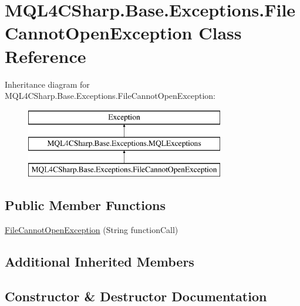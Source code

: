 \hypertarget{class_m_q_l4_c_sharp_1_1_base_1_1_exceptions_1_1_file_cannot_open_exception}{}\section{M\+Q\+L4\+C\+Sharp.\+Base.\+Exceptions.\+File\+Cannot\+Open\+Exception Class Reference}
\label{class_m_q_l4_c_sharp_1_1_base_1_1_exceptions_1_1_file_cannot_open_exception}
Inheritance diagram for M\+Q\+L4\+C\+Sharp.\+Base.\+Exceptions.\+File\+Cannot\+Open\+Exception\+:\begin{figure}[H]
\begin{center}
\leavevmode
\includegraphics[height=3.000000cm]{class_m_q_l4_c_sharp_1_1_base_1_1_exceptions_1_1_file_cannot_open_exception}
\end{center}
\end{figure}
\subsection*{Public Member Functions}
\begin{DoxyCompactItemize}
\item 
\hyperlink{class_m_q_l4_c_sharp_1_1_base_1_1_exceptions_1_1_file_cannot_open_exception_a1519ff2d04134ff09c2baa437fd75d2f}{File\+Cannot\+Open\+Exception} (String function\+Call)
\end{DoxyCompactItemize}
\subsection*{Additional Inherited Members}


\subsection{Constructor \& Destructor Documentation}

